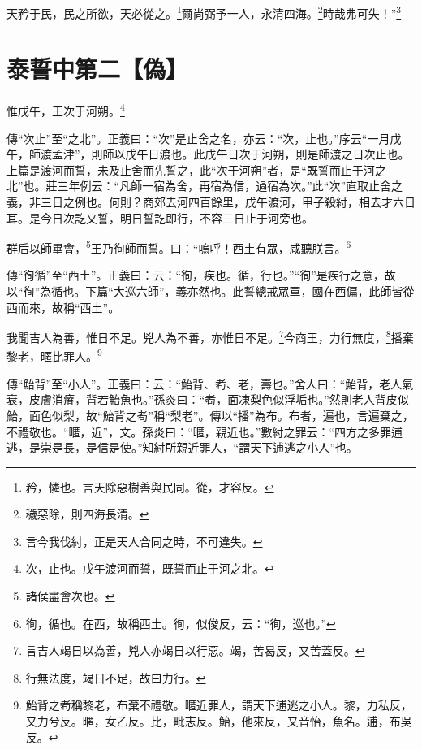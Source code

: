 天矜于民，民之所欲，天必從之。\footnote{矜，憐也。言天除惡樹善與民同。從，才容反。}爾尚弼予一人，永清四海。\footnote{穢惡除，則四海長清。}時哉弗可失！”\footnote{言今我伐紂，正是天人合同之時，不可違失。}

\section{泰誓中第二【偽】}


惟戊午，王次于河朔。\footnote{次，止也。戊午渡河而誓，既誓而止于河之北。}

{\noindent\zhuan{}\fzbyks 傳“次止”至“之北”。正義曰：“次”是止舍之名，亦云：“次，止也。”序云“一月戊午，師渡孟津”，則師以戊午日渡也。此戊午日次于河朔，則是師渡之日次止也。上篇是渡河而誓，未及止舍而先誓之，此“次于河朔”者，是“既誓而止于河之北”也。莊三年例云：“凡師一宿為舍，再宿為信，過宿為次。”此“次”直取止舍之義，非三日之例也。何則？商郊去河四百餘里，戊午渡河，甲子殺紂，相去才六日耳。是今日次訖又誓，明日誓訖即行，不容三日止于河旁也。 \par}

群后以師畢會，\footnote{諸侯盡會次也。}王乃徇師而誓。曰：“嗚呼！西土有眾，咸聽朕言。\footnote{徇，循也。在西，故稱西土。徇，似俊反，云：“徇，巡也。”}

{\noindent\zhuan{}\fzbyks 傳“徇循”至“西土”。正義曰：云：“徇，疾也。循，行也。”“徇”是疾行之意，故以“徇”為循也。下篇“大巡六師”，義亦然也。此誓總戒眾軍，國在西偏，此師皆從西而來，故稱“西土”。 \par}

我聞吉人為善，惟日不足。兇人為不善，亦惟日不足。\footnote{言吉人竭日以為善，兇人亦竭日以行惡。竭，苦曷反，又苦蓋反。}今商王，力行無度，\footnote{行無法度，竭日不足，故曰力行。}播棄黎老，暱比罪人。\footnote{鮐背之耇稱黎老，布棄不禮敬。暱近罪人，謂天下逋逃之小人。黎，力私反，又力兮反。暱，女乙反。比，毗志反。鮐，他來反，又音怡，魚名。逋，布吳反。}

{\noindent\zhuan{}\fzbyks 傳“鮐背”至“小人”。正義曰：云：“鮐背、耇、老，壽也。”舍人曰：“鮐背，老人氣衰，皮膚消瘠，背若鮐魚也。”孫炎曰：“耇，面凍梨色似浮垢也。”然則老人背皮似鮐，面色似梨，故“鮐背之耇”稱“梨老”。傳以“播”為布。布者，遍也，言遍棄之，不禮敬也。“暱，近”，文。孫炎曰：“暱，親近也。”數紂之罪云：“四方之多罪逋逃，是崇是長，是信是使。”知紂所親近罪人，“謂天下逋逃之小人”也。 \par}

